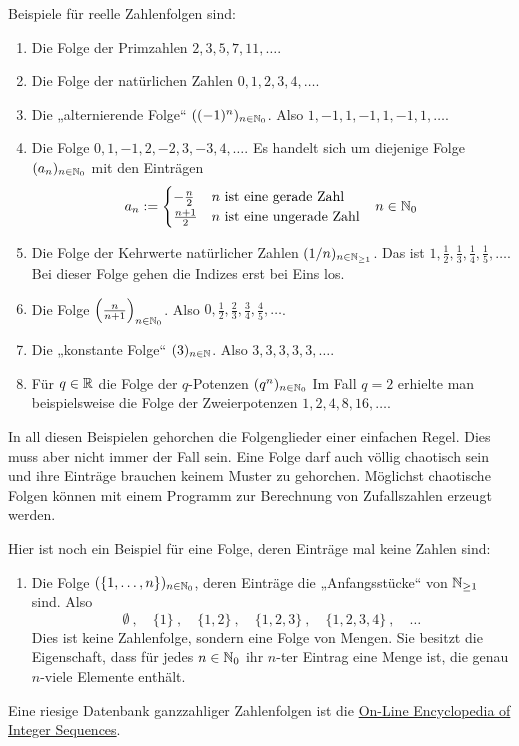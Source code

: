 \begin{bsp}
    Beispiele für reelle Zahlenfolgen sind:
    \begin{enumerate}
        \item Die Folge der Primzahlen $2,3,5,7,11,\dots$.
        \item Die Folge der natürlichen Zahlen $0,1,2,3,4,\dots$.
        \item Die „alternierende Folge“ $((-1)^n)_{n\in \mathbb N_0}$. Also $1,-1,1,-1,1,-1,1,\dots$.
        \item Die Folge $0,1,-1,2,-2,3,-3,4,\dots$. Es handelt sich um diejenige Folge $(a_n)_{n\in \mathbb N_0}$ mit den Einträgen
        \begin{align*}
            a_n := \begin{cases}
                -\frac{n}{2} & n\ \text{ist eine gerade Zahl} \\
                \frac{n+1}{2} & n\ \text{ist eine ungerade Zahl}
            \end{cases} && n \in \mathbb N_0
        \end{align*}
        \item Die Folge der Kehrwerte natürlicher Zahlen $(1/n)_{n\in \mathbb N_{\ge 1}}$. Das ist  $1,\frac{1}{2},\frac{1}{3},\frac{1}{4},\frac{1}{5},\dots$. Bei dieser Folge gehen die Indizes erst bei Eins los.
        \item Die Folge $\left(\frac{n}{n+1}\right)_{n\in \mathbb N_0}$. Also $0,\frac{1}{2},\frac{2}{3},\frac{3}{4},\frac{4}{5},\dots$.
        \item Die „konstante Folge“ $(3)_{n\in \mathbb N}$. Also $3,3,3,3,3,\dots$.
        \item Für $q\in \mathbb R$ die Folge der $q$-Potenzen $(q^n)_{n\in \mathbb N_0}$ Im Fall $q=2$ erhielte man beispielsweise die Folge der Zweierpotenzen $1,2,4,8,16,\dots$.
    \end{enumerate}
    In all diesen Beispielen gehorchen die Folgenglieder einer einfachen Regel. Dies muss aber nicht immer der Fall sein. Eine Folge darf auch völlig chaotisch sein und ihre Einträge brauchen keinem Muster zu gehorchen. Möglichst chaotische Folgen können mit einem Programm zur Berechnung von Zufallszahlen erzeugt werden.
        
    Hier ist noch ein Beispiel für eine Folge, deren Einträge mal keine Zahlen sind:
    \begin{enumerate}[(9)]
        \item Die Folge $(\{1,\dots , n\})_{n\in \mathbb N_0}$, deren Einträge die „Anfangsstücke“ von $\mathbb N_{\ge 1}$ sind. Also
            \[ \emptyset\ ,\quad \{1\}\ ,\quad \{1,2\}\ ,\quad \{1,2,3\}\ ,\quad \{1,2,3,4\}\ , \quad \dots \]
        Dies ist keine Zahlenfolge, sondern eine Folge von Mengen. Sie besitzt die Eigenschaft, dass für jedes $n\in \mathbb N_0$ ihr $n$-ter Eintrag eine Menge ist, die genau $n$-viele Elemente enthält.
    \end{enumerate}
    Eine riesige Datenbank ganzzahliger Zahlenfolgen ist die \href{https://oeis.org/}{On-Line Encyclopedia of Integer Sequences}.
\end{bsp}



